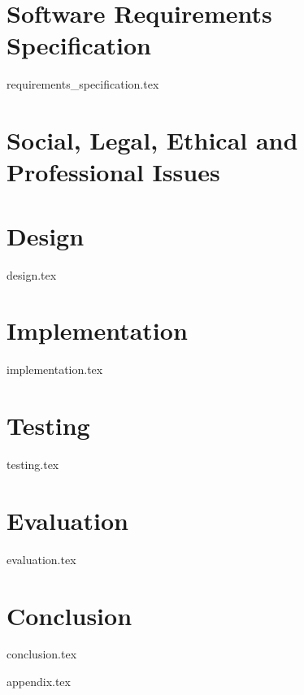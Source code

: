 \documentclass[a4paper, 12pt, oneside]{book}
\begin{document}
\chapter{Software Requirements Specification}
    {requirements_specification.tex}

\chapter{Social, Legal, Ethical and Professional Issues}

\chapter{Design}
{design.tex}

\chapter{Implementation}
{implementation.tex}

\chapter{Testing}
{testing.tex}

\chapter{Evaluation}
{evaluation.tex}

\chapter{Conclusion}
{conclusion.tex}

\backmatter

\setcounter{page}{1} %



\setlength{} %
\printbibliography[heading=bibintoc, title = {References}]



\appendix
\renewcommand{\thechapter}{\alph{chapter}}
{appendix.tex}
\end{document}
